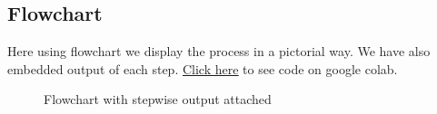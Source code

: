 \documentclass[12pt,a4paper]{article}
\begin{document}
\subsection{Flowchart}
Here using flowchart we display the process in a pictorial way. We have also embedded output of each step. \href{https://colab.research.google.com/drive/1agcn__WBpbA9k0HENXSKC-bVSmDKB_De?usp=sharing}{\underline{Click here}} to see code on google colab.
\begin{figure}[!htb]
        \caption{\label{fig:my-label}Flowchart with stepwise output attached}
      \end{figure}

\end{document}
